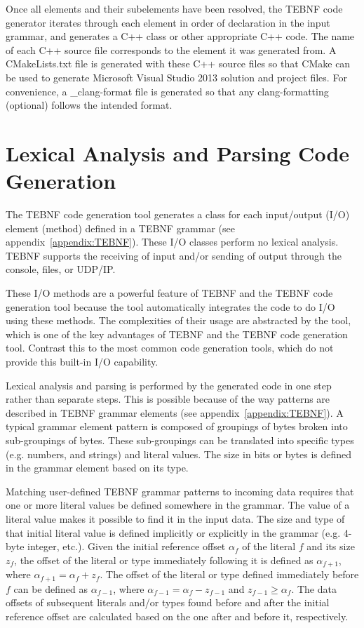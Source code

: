 \indent
Once all elements and their subelements have been resolved, the TEBNF code generator iterates through each element in order of declaration in the input grammar, and generates a C++ class or other appropriate C++ code.  The name of each C++ source file corresponds to the element it was generated from.  A CMakeLists.txt file is generated with these C++ source files so that CMake can be used to generate Microsoft Visual Studio 2013 solution and project files.  For convenience, a \_clang-format file is generated so that any clang-formatting (optional) follows the intended format.

\section{Lexical Analysis and Parsing Code Generation}
The TEBNF code generation tool generates a class for each input/output (I/O) element (method) defined in a TEBNF grammar (see appendix~\ref{appendix:TEBNF}).  These I/O classes perform no lexical analysis.  TEBNF supports the receiving of input and/or sending of output through the console, files, or UDP/IP.

\indent
These I/O methods are a powerful feature of TEBNF and the TEBNF code generation tool because the tool automatically integrates the code to do I/O using these methods.  The complexities of their usage are abstracted by the tool, which is one of the key advantages of TEBNF and the TEBNF code generation tool.  Contrast this to the most common code generation tools, which do not provide this built-in I/O capability.

\indent
Lexical analysis and parsing is performed by the generated code in one step rather than separate steps.  This is possible because of the way patterns are described in TEBNF grammar elements (see appendix~\ref{appendix:TEBNF}).  A typical grammar element pattern is composed of groupings of bytes broken into sub-groupings of bytes.  These sub-groupings can be translated into specific types (e.g. numbers, and strings) and literal values.  The size in bits or bytes is defined in the grammar element based on its type.

\indent
Matching user-defined TEBNF grammar patterns to incoming data requires that one or more literal values be defined somewhere in the grammar.  The value of a literal value makes it possible to find it in the input data.  The size and type of that initial literal value is defined implicitly or explicitly in the grammar (e.g. 4-byte integer, etc.).  Given the initial reference offset $ \alpha_f $ of the literal $ f $ and its size $ z_f $, the offset of the literal or type immediately following it is defined as $ \alpha_{f+1} $, where $ \alpha_{f+1} = \alpha_f + z_f $.  The offset of the literal or type defined immediately before $ f $ can be defined as $ \alpha_{f-1} $, where $ \alpha_{f-1} = \alpha_f {-} z_{f-1} $ and $ z_{f-1} \geq \alpha_f $.  The data offsets of subsequent literals and/or types found before and after the initial reference offset are calculated based on the one after and before it, respectively.

